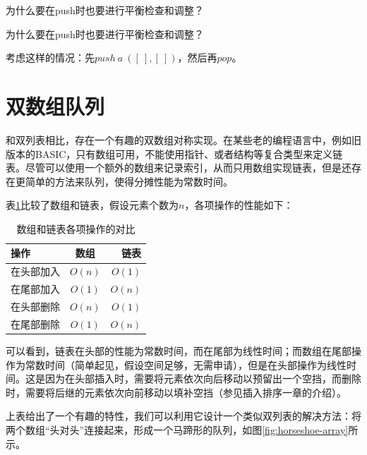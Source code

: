 \documentclass[b5paper]{ctexart}
\begin{document}
\begin{Exercise}
为什么要在push时也要进行平衡检查和调整？
\end{Exercise}

\begin{Answer}
为什么要在push时也要进行平衡检查和调整？

考虑这样的情况：先$push\ a\ ([\ ], [\ ])$，然后再$pop$。
\end{Answer}

\section{双数组队列}

和双列表相比，存在一个有趣的双数组对称实现。在某些老的编程语言中，例如旧版本的BASIC，只有数组可用，不能使用指针、或者结构等复合类型来定义链表。尽管可以使用一个额外的数组来记录索引，从而只用数组实现链表，但是还存在更简单的方法来队列，使得分摊性能为常数时间。

表\ref{tab:array-list-comp}比较了数组和链表，假设元素个数为$n$，各项操作的性能如下：

\begin{table}[htbp]
\centering
\begin{tabular}{l | c | r}
  \hline
  操作 & 数组 & 链表 \\
  \hline
  在头部加入 & $O(n)$ & $O(1)$ \\
  在尾部加入 & $O(1)$ & $O(n)$ \\
  在头部删除 & $O(n)$ & $O(1)$ \\
  在尾部删除 & $O(1)$ & $O(n)$ \\
  \hline
\end{tabular}
\caption{数组和链表各项操作的对比} \label{tab:array-list-comp}
\end{table}

可以看到，链表在头部的性能为常数时间，而在尾部为线性时间；而数组在尾部操作为常数时间（简单起见，假设空间足够，无需申请），但是在头部操作为线性时间。这是因为在头部插入时，需要将元素依次向后移动以预留出一个空挡，而删除时，需要将后继的元素依次向前移动以填补空挡（参见插入排序一章的介绍）。

上表给出了一个有趣的特性，我们可以利用它设计一个类似双列表的解决方法：将两个数组“头对头”连接起来，形成一个马蹄形的队列，如图\ref{fig:horseshoe-array}所示。
\end{document}
